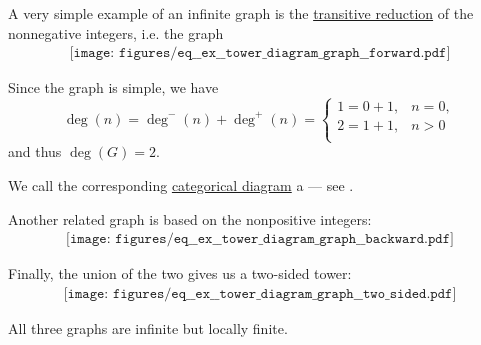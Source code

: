 \begin{example}\label{ex:tower_diagram_graph}
  A very simple example of an infinite graph is the \hyperref[def:relation_closures/transitive]{transitive reduction} of the nonnegative integers, i.e. the graph
  \begin{equation}\label{eq:ex:tower_diagram_graph/forward}
    \begin{aligned}
      \texttt{[image: figures/eq\_\_ex\_\_tower\_diagram\_graph\_\_forward.pdf]}
    \end{aligned}
  \end{equation}

  Since the graph is simple, we have
  \begin{equation*}
    \deg(n) = \deg^-(n) + \deg^+(n) = \begin{cases}
      1 = 0 + 1, &n = 0, \\
      2 = 1 + 1, &n > 0 \\
    \end{cases}
  \end{equation*}
  and thus \( \deg(G) = 2 \).

  We call the corresponding \hyperref[def:categorical_diagram]{categorical diagram} a  --- see .

  Another related graph is based on the nonpositive integers:
  \begin{equation}\label{eq:ex:tower_diagram_graph/backward}
    \begin{aligned}
      \texttt{[image: figures/eq\_\_ex\_\_tower\_diagram\_graph\_\_backward.pdf]}
    \end{aligned}
  \end{equation}

  Finally, the union of the two gives us a two-sided tower:
  \begin{equation}\label{eq:ex:tower_diagram_graph/two_sided}
    \begin{aligned}
      \texttt{[image: figures/eq\_\_ex\_\_tower\_diagram\_graph\_\_two\_sided.pdf]}
    \end{aligned}
  \end{equation}

  All three graphs are infinite but locally finite.
\end{example}

